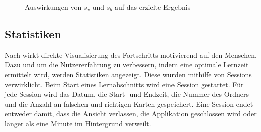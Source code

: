 \begin{figure}[H]
{}
    \hfill
  \caption{Auswirkungen von $s_v$ und $s_b$ auf das erzielte Ergebnis}
\end{figure}
\label{graphen_rechnung}
\subsection{Statistiken}
Nach \cite{AtomicHabits} wirkt direkte Visualisierung des Fortschritts motivierend auf den Menschen. Dazu und um die Nutzererfahrung zu verbessern, indem eine optimale Lernzeit ermittelt wird, werden Statistiken angezeigt. Diese wurden mithilfe von Sessions verwirklicht. Beim Start eines Lernabschnitts wird eine Session gestartet. Für jede Session wird das Datum, die Start- und Endzeit, die Nummer des Ordners und die Anzahl an falschen und richtigen Karten gespeichert. Eine Session endet entweder damit, dass die Ansicht verlassen, die Applikation geschlossen wird oder länger als eine Minute im Hintergrund verweilt.

